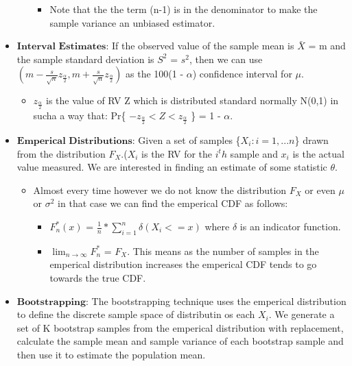 \documentclass[11pt]{article}
\providecommand{\tightlist}{%
      \setlength{\itemsep}{0pt}\setlength{\parskip}{0pt}}
\begin{document}
\begin{itemize}
\begin{itemize}
    \begin{itemize}
    \tightlist
    \item
      Note that the the term (n-1) is in the denominator to make the
      sample variance an unbiased estimator.
    \end{itemize}
  \end{itemize}
\item
  \(\textbf{Interval Estimates}\): If the observed value of the sample
  mean is \(\bar{X}\) = m and the sample standard deviation is \(S^2\) =
  \(s^2\), then we can use
  \((m - \frac{s}{\sqrt{n}}z_{\frac{\alpha}{2}},m + \frac{s}{\sqrt{n}}z_{\frac{\alpha}{2}})\)
  as the 100(1 - \(\alpha\)) confidence interval for \(\mu\).

  \begin{itemize}
  \tightlist
  \item
    \(z_{\frac{\alpha}{2}}\) is the value of RV Z which is distributed
    standard normally N(0,1) in sucha a way that: Pr\{
    \(-z_{\frac{\alpha}{2}} < Z < z_{\frac{\alpha}{2}}\) \} = 1 -
    \(\alpha\).
  \end{itemize}
\item
  \(\textbf{Emperical Distributions}\): Given a set of samples
  \{\(X_i : i = 1,...n\)\} drawn from the distribution \(F_X\).(\(X_i\)
  is the RV for the \(i^th\) sample and \(x_i\) is the actual value
  measured. We are interested in finding an estimate of some statistic
  \(\theta\).

  \begin{itemize}
  \item
    Almost every time however we do not know the distribution \(F_X\) or
    even \(\mu\) or \(\sigma^2\) in that case we can find the emperical
    CDF as follows:

    \begin{itemize}
    \tightlist
    \item
      \(F_{n}^{*}(x)\) =
      \(\frac{1}{n} * \sum_{i=1}^{n} \delta(X_i <= x)\) where \(\delta\)
      is an indicator function.
    \item
      \(\lim_{n\to\infty} F_{n}^{*}\) = \(F_{X}\). This means as the
      number of samples in the emperical distribution increases the
      emperical CDF tends to go towards the true CDF.
    \end{itemize}
  \end{itemize}
\item
  \(\textbf{Bootstrapping}\): The bootstrapping technique uses the
  emperical distribution to define the discrete sample space of
  distributin os each \(X_i\). We generate a set of K bootstrap samples
  from the emperical distribution with replacement, calculate the sample
  mean and sample variance of each bootstrap sample and then use it to
  estimate the population mean.
\end{itemize}
\end{document}
